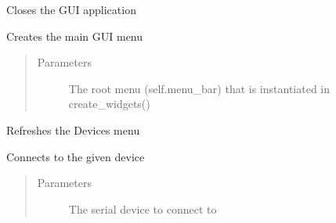 \documentclass[letterpaper,10pt,english,openany,oneside]{sphinxmanual}
\begin{document}
\begin{fulllineitems}
\begin{fulllineitems}
\end{fulllineitems}


\begin{fulllineitems}
\label{\detokenize{src/application:Application.Application.close_app}}
Closes the GUI application

\end{fulllineitems}


\begin{fulllineitems}
\label{\detokenize{src/application:Application.Application.create_menu}}
Creates the main GUI menu
\begin{quote}\begin{description}
\item[{Parameters}] \leavevmode
{} \textendash{} The root menu (self.menu\_bar) that is instantiated in create\_widgets()

\end{description}\end{quote}

\end{fulllineitems}


\begin{fulllineitems}
\label{\detokenize{src/application:Application.Application.refresh_devices}}
Refreshes the Devices menu

\end{fulllineitems}


\begin{fulllineitems}
\label{\detokenize{src/application:Application.Application.connect}}
Connects to the given device
\begin{quote}\begin{description}
\item[{Parameters}] \leavevmode
{} \textendash{} The serial device to connect to


\end{description}
\end{quote}
\end{fulllineitems}
\end{fulllineitems}
\end{document}
